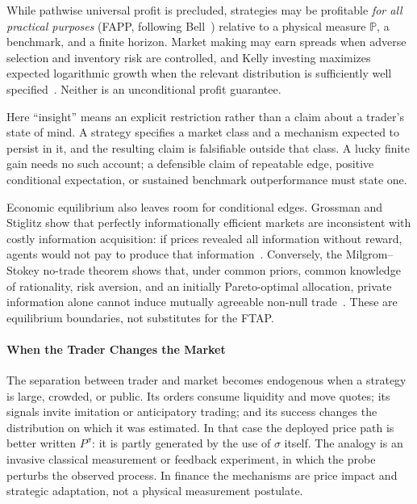 \documentclass[aps,pra,reprint,superscriptaddress,amsmath,amssymb,floatfix]{revtex4-2}
\theoremstyle{plain}
\theoremstyle{definition}
\theoremstyle{remark}
\begin{document}
While pathwise universal profit is precluded, strategies may be profitable
\emph{for all practical purposes} (FAPP, following Bell~\cite{bell-a})
relative to a physical measure \(\mathbb{P}\), a benchmark, and a finite
horizon. Market making may earn spreads when adverse selection and inventory
risk are controlled, and Kelly investing maximizes expected logarithmic
growth when the relevant distribution is sufficiently well
specified~\cite{Kelly1956}. Neither is an unconditional profit guarantee.

Here ``insight'' means an explicit restriction rather than a claim about a
trader's state of mind. A strategy specifies a market class and a mechanism
expected to persist in it, and the resulting claim is falsifiable outside that
class. A lucky finite gain needs no such account; a defensible claim of
repeatable edge, positive conditional expectation, or sustained benchmark
outperformance must state one.

Economic equilibrium also leaves room for conditional edges. Grossman and
Stiglitz show that perfectly informationally efficient markets are
inconsistent with costly information acquisition: if prices revealed all
information without reward, agents would not pay to produce that
information~\cite{GrossmanStiglitz1980}. Conversely, the Milgrom--Stokey
no-trade theorem shows that, under common priors, common knowledge of
rationality, risk aversion, and an initially Pareto-optimal allocation, private
information alone cannot induce mutually agreeable non-null
trade~\cite{MilgromStokey1982}. These are equilibrium boundaries, not
substitutes for the FTAP.

\paragraph{When the Trader Changes the Market}

The separation between trader and market becomes endogenous when a strategy is
large, crowded, or public. Its orders consume liquidity and move quotes; its
signals invite imitation or anticipatory trading; and its success changes the
distribution on which it was estimated. In that case the deployed price path
is better written \(P^\sigma\): it is partly generated by the use of
\(\sigma\) itself. The analogy is an invasive classical measurement or
feedback experiment, in which the probe perturbs the observed process. In
finance the mechanisms are price impact and strategic adaptation, not a
physical measurement postulate.
\end{document}
